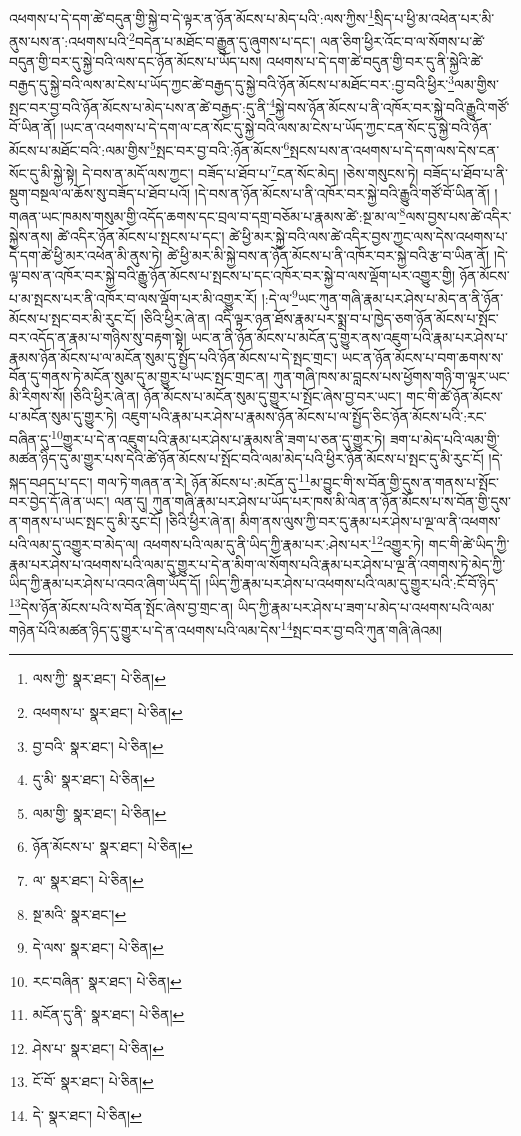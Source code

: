འཕགས་པ་དེ་དག་ཚེ་བདུན་གྱི་སྐྱེ་བ་དེ་ལྟར་ན་ཉོན་མོངས་པ་མེད་པའི་:ལས་ཀྱིས་\footnote{ལས་ཀྱི་  སྣར་ཐང་།  པེ་ཅིན། }སྲིད་པ་ཕྱི་མ་འཕེན་པར་མི་ནུས་པས་ན་:འཕགས་པའི་\footnote{འཕགས་པ་  སྣར་ཐང་།  པེ་ཅིན། }བདེན་པ་མཐོང་བ་རྒྱུན་དུ་ཞུགས་པ་དང་། ལན་ཅིག་ཕྱིར་འོང་བ་ལ་སོགས་པ་ཚེ་བདུན་གྱི་བར་དུ་སྐྱེ་བའི་ལས་དང་ཉོན་མོངས་པ་ཡོད་པས། འཕགས་པ་དེ་དག་ཚེ་བདུན་གྱི་བར་དུ་ནི་སྐྱེའི་ཚེ་བརྒྱད་དུ་སྐྱེ་བའི་ལས་མ་ངེས་པ་ཡོད་ཀྱང་ཚེ་བརྒྱད་དུ་སྐྱེ་བའི་ཉོན་མོངས་པ་མཐོང་བར་:བྱ་བའི་ཕྱིར་\footnote{བྱ་བའི་  སྣར་ཐང་།  པེ་ཅིན། }ལམ་གྱིས་སྤང་བར་བྱ་བའི་ཉོན་མོངས་པ་མེད་པས་ན་ཚེ་བརྒྱད་:དུ་ནི་\footnote{དུ་མི་  སྣར་ཐང་།  པེ་ཅིན། }སྐྱེ་བས་ཉོན་མོངས་པ་ནི་འཁོར་བར་སྐྱེ་བའི་རྒྱུའི་གཙོ་བོ་ཡིན་ནོ། །ཡང་ན་འཕགས་པ་དེ་དག་ལ་ངན་སོང་དུ་སྐྱེ་བའི་ལས་མ་ངེས་པ་ཡོད་ཀྱང་ངན་སོང་དུ་སྐྱེ་བའི་ཉོན་མོངས་པ་མཐོང་བའི་:ལམ་གྱིས་\footnote{ལམ་གྱི་  སྣར་ཐང་།  པེ་ཅིན། }སྤང་བར་བྱ་བའི་:ཉོན་མོངས་\footnote{ཉོན་མོངས་པ་  སྣར་ཐང་།  པེ་ཅིན། }སྤངས་པས་ན་འཕགས་པ་དེ་དག་ལས་དེས་ངན་སོང་དུ་མི་སྐྱེ་སྟེ། དེ་བས་ན་མདོ་ལས་ཀྱང་། བཟོད་པ་ཐོབ་པ་\footnote{ལ་  སྣར་ཐང་།  པེ་ཅིན། }ངན་སོང་མེད། །ཅེས་གསུངས་ཏེ། བཟོད་པ་ཐོབ་པ་ནི་སྡུག་བསྔལ་ལ་ཆོས་སུ་བཟོད་པ་ཐོབ་པའོ། །དེ་བས་ན་ཉོན་མོངས་པ་ནི་འཁོར་བར་སྐྱེ་བའི་རྒྱུའི་གཙོ་བོ་ཡིན་ནོ། །གཞན་ཡང་ཁམས་གསུམ་གྱི་འདོད་ཆགས་དང་བྲལ་བ་དགྲ་བཅོམ་པ་རྣམས་ཚེ་:སྔ་མ་ལ་\footnote{སྔ་མའི་  སྣར་ཐང་། }ལས་བྱས་པས་ཚེ་འདིར་སྐྱེས་ནས། ཚེ་འདིར་ཉོན་མོངས་པ་སྤངས་པ་དང་། ཚེ་ཕྱི་མར་སྐྱེ་བའི་ལས་ཚེ་འདིར་བྱས་ཀྱང་ལས་དེས་འཕགས་པ་དེ་དག་ཚེ་ཕྱི་མར་འཕེན་མི་ནུས་ཏེ། ཚེ་ཕྱི་མར་མི་སྐྱེ་བས་ན་ཉོན་མོངས་པ་ནི་འཁོར་བར་སྐྱེ་བའི་རྩ་བ་ཡིན་ནོ། །དེ་ལྟ་བས་ན་འཁོར་བར་སྐྱེ་བའི་རྒྱུ་ཉོན་མོངས་པ་སྤངས་པ་དང་འཁོར་བར་སྐྱེ་བ་ལས་ལྡོག་པར་འགྱུར་གྱི། ཉོན་མོངས་པ་མ་སྤངས་པར་ནི་འཁོར་བ་ལས་ལྡོག་པར་མི་འགྱུར་རོ། །:དེ་ལ་\footnote{དེ་ལས་  སྣར་ཐང་།  པེ་ཅིན། }ཡང་ཀུན་གཞི་རྣམ་པར་ཤེས་པ་མེད་ན་ནི་ཉོན་མོངས་པ་སྤང་བར་མི་རུང་ངོ། །ཅིའི་ཕྱིར་ཞེ་ན། འདི་ལྟར་ཉན་ཐོས་རྣམ་པར་སྨྲ་བ་པ་ཁྱེད་ཅག་ཉོན་མོངས་པ་སྤོང་བར་འདོད་ན་རྣམ་པ་གཉིས་སུ་བརྟག་སྟེ། ཡང་ན་ནི་ཉོན་མོངས་པ་མངོན་དུ་གྱུར་ནས་འཇུག་པའི་རྣམ་པར་ཤེས་པ་རྣམས་ཉོན་མོངས་པ་ལ་མངོན་སུམ་དུ་སྤྱོད་པའི་ཉོན་མོངས་པ་དེ་སྤང་གྲང་། ཡང་ན་ཉོན་མོངས་པ་བག་ཆགས་ས་བོན་དུ་གནས་ཏེ་མངོན་སུམ་དུ་མ་གྱུར་པ་ཡང་སྤང་གྲང་ན། ཀུན་གཞི་ཁས་མ་བླངས་པས་ཕྱོགས་གཉི་ག་ལྟར་ཡང་མི་རིགས་སོ། །ཅིའི་ཕྱིར་ཞེ་ན། ཉོན་མོངས་པ་མངོན་སུམ་དུ་གྱུར་པ་སྤོང་ཞེས་བྱ་བར་ཡང་། གང་གི་ཚེ་ཉོན་མོངས་པ་མངོན་སུམ་དུ་གྱུར་ཏེ། འཇུག་པའི་རྣམ་པར་ཤེས་པ་རྣམས་ཉོན་མོངས་པ་ལ་སྤྱོད་ཅིང་ཉོན་མོངས་པའི་:རང་བཞིན་དུ་\footnote{རང་བཞིན་  སྣར་ཐང་།  པེ་ཅིན། }གྱུར་པ་དེ་ན་འཇུག་པའི་རྣམ་པར་ཤེས་པ་རྣམས་ནི་ཟག་པ་ཅན་དུ་གྱུར་ཏེ། ཟག་པ་མེད་པའི་ལམ་གྱི་མཚན་ཉིད་དུ་མ་གྱུར་པས་དེའི་ཚེ་ཉོན་མོངས་པ་སྤོང་བའི་ལམ་མེད་པའི་ཕྱིར་ཉོན་མོངས་པ་སྤང་དུ་མི་རུང་ངོ། །དེ་སྐད་བཤད་པ་དང་། གལ་ཏེ་གཞན་ན་རེ། ཉོན་མོངས་པ་:མངོན་དུ་\footnote{མངོན་དུ་ནི་  སྣར་ཐང་།  པེ་ཅིན། }མ་བྱུང་གི་ས་བོན་གྱི་དུས་ན་གནས་པ་སྤོང་བར་བྱེད་དོ་ཞེ་ན་ཡང་། ལན་དུ། ཀུན་གཞི་རྣམ་པར་ཤེས་པ་ཡོད་པར་ཁས་མི་ལེན་ན་ཉོན་མོངས་པ་ས་བོན་གྱི་དུས་ན་གནས་པ་ཡང་སྤང་དུ་མི་རུང་ངོ། །ཅིའི་ཕྱིར་ཞེ་ན། མིག་ནས་ལུས་ཀྱི་བར་དུ་རྣམ་པར་ཤེས་པ་ལྔ་ལ་ནི་འཕགས་པའི་ལམ་དུ་འགྱུར་བ་མེད་ལ། འཕགས་པའི་ལམ་དུ་ནི་ཡིད་ཀྱི་རྣམ་པར་:ཤེས་པར་\footnote{ཤེས་པ་  སྣར་ཐང་།  པེ་ཅིན། }འགྱུར་ཏེ། གང་གི་ཚེ་ཡིད་ཀྱི་རྣམ་པར་ཤེས་པ་འཕགས་པའི་ལམ་དུ་གྱུར་པ་དེ་ན་མིག་ལ་སོགས་པའི་རྣམ་པར་ཤེས་པ་ལྔ་ནི་འགགས་ཏེ་མེད་ཀྱི་ཡིད་ཀྱི་རྣམ་པར་ཤེས་པ་འབའ་ཞིག་ཡོད་དོ། །ཡིད་ཀྱི་རྣམ་པར་ཤེས་པ་འཕགས་པའི་ལམ་དུ་གྱུར་པའི་:ངོ་བོ་ཉིད་\footnote{ངོ་བོ་  སྣར་ཐང་།  པེ་ཅིན། }དེས་ཉོན་མོངས་པའི་ས་བོན་སྤོང་ཞེས་བྱ་གྲང་ན། ཡིད་ཀྱི་རྣམ་པར་ཤེས་པ་ཟག་པ་མེད་པ་འཕགས་པའི་ལམ་གཉེན་པོའི་མཚན་ཉིད་དུ་གྱུར་པ་དེ་ན་འཕགས་པའི་ལམ་དེས་\footnote{དེ་  སྣར་ཐང་།  པེ་ཅིན། }སྤང་བར་བྱ་བའི་ཀུན་གཞི་ཞེའམ། 